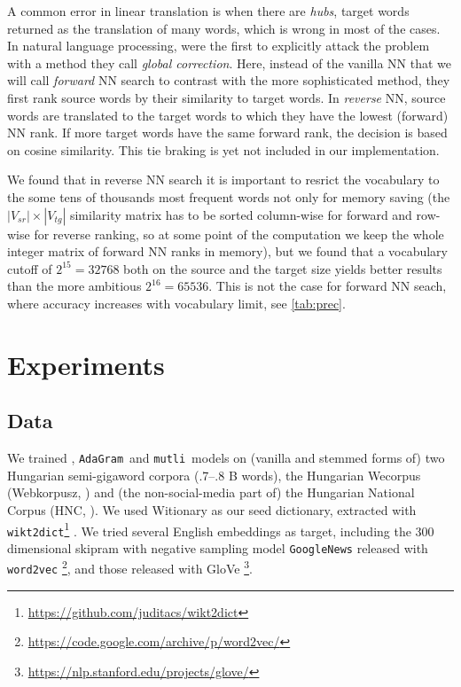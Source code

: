 \documentclass[11pt]{article}
\newcommand{\neelakantan}{\cite{Neelakantan:2014}}
\newcommand{\adagram}{\texttt{AdaGram}}
\newcommand{\mutli}{\texttt{mutli}}
\begin{document}
A common error in linear translation is when there are \emph{hubs}, target
words returned as the translation of many words, which is wrong in most of the
cases.  In natural language processing, \cite{Dinu:2015} were the first to
explicitly attack the problem with a method they call \emph{global correction}.
Here, instead of the vanilla NN that we will call \emph{forward} NN search to
contrast with the more sophisticated method, they first rank source words by
their similarity to target words. In \emph{reverse} NN, source words are
translated to the target words to which they have the lowest (forward) NN rank.
\todo{} If more target words have the same forward rank, the decision is based
on cosine similarity. This tie braking is yet not included in our
implementation.


We found that in reverse NN search it is important to resrict the vocabulary to
the some tens of thousands most frequent words not only for memory saving (the
$|V_{sr}|\times|V_{tg}|$ similarity matrix has to be sorted column-wise for
forward and row-wise for reverse ranking, so at some point of the computation
we keep the whole integer matrix of forward NN ranks in memory), but we found
that a vocabulary cutoff of $2^{15}=32768$ both on the source and the target
size yields better results than the more ambitious $2^{16}=65536$. This is not
the case for forward NN seach, where accuracy increases with vocabulary limit,
see \cref{tab:prec}.

\section{Experiments}

\subsection{Data}

We trained \neelakantan, \adagram~and \mutli~models on (vanilla and stemmed
forms of) two Hungarian semi-gigaword corpora (.7--.8 B words), the Hungarian
Wecorpus (Webkorpusz, \cite{Halacsy:2004}) and (the non-social-media part of) the
Hungarian National Corpus (HNC, \cite{Oravecz:2014}).  We used Witionary as our
seed dictionary, extracted with
\texttt{wikt2dict}\footnote{\url{https://github.com/juditacs/wikt2dict}}
\citep{Acs:2013}. We tried several English embeddings as target, including the
300 dimensional skipram with negative sampling model
\texttt{GoogleNews} released with \texttt{word2vec}
\citep{Mikolov:2013f}\footnote{\url{https://code.google.com/archive/p/word2vec/}},
and those released with GloVe
\citep{Pennington:2014}\footnote{\url{https://nlp.stanford.edu/projects/glove/}}.
\end{document}
